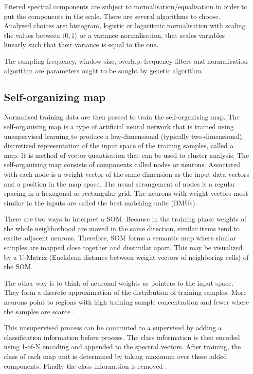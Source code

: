 \documentclass[a4paper]{IEEEtran}
\begin{document}
Fitered spectral components are subject to normalisation/equalisation
in order to put the components
in the scale. There are several algorithms to choose. Analysed choices are:
histogram, logistic or logaritmic normalisation
with scaling the values between $ \langle 0, 1 \rangle $ or a variance normalisation,
that scales variables linearly such that their variance is equal to the one.

The sampling frequency, window size, overlap, frequency filters and 
normalisation algorithm
are parameters ought to be sought by genetic algorithm.

\subsection{Self-organizing map}
Normalised training data are then passed to train 
the self-organising map.
The self-organising map is a type of artificial neural network that is
trained using unsupervised learning to produce a low-dimensional 
(typically two-dimensional), discretized representation of the input 
space of the training samples, called a map. It is method of vector 
quantisation that can be used to 
cluster analysis.
The self-organizing map consists of components called nodes or neurons. 
Associated with each node is a weight vector of the same dimension 
as the input data vectors and a position in the map space. 
The usual arrangement of nodes is a regular spacing in a hexagonal or rectangular grid. 
The neurons with weight vectors most similar to the inputs are called 
the best matching units (BMUs).

There are two ways to interpret a SOM. 
Because in the training phase weights of the whole neighborhood are moved in the 
same direction, similar items tend to excite adjacent neurons. Therefore, 
SOM forms a semantic map where similar samples are mapped close together 
and dissimilar apart. This may be visualized by a U-Matrix 
(Euclidean distance between weight vectors of neighboring cells) of the SOM.

The other way is to think of neuronal weights as pointers to the input space. 
They form a discrete approximation of the distribution of training samples.
More neurons point to regions with high training sample concentration and 
fewer where the samples are scarce \cite{somwiki}.

This unsupervised process can be commuted to a supervised by adding a classification
information before process.
The class information is then encoded using 1-of-N encoding and appended to the 
spectral vectors. After training, the class of each map unit
is determined by taking maximum over these added components.
Finally the class information is removed \cite{somtoolbox}.
\end{document}

